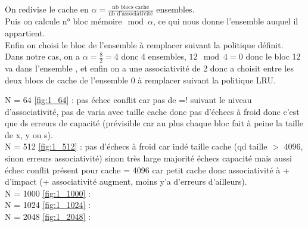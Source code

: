 \documentclass[12pt]{base}
\begin{document}


On redivise le cache en $\alpha = \frac{\text{nb blocs cache}}{\text{nb d'associativité}}$ ensembles.\\
\newline
Puis on calcule n° bloc mémoire$\mod \alpha$, ce qui nous donne l'ensemble auquel il appartient.\\
Enfin on choisi le bloc de l'ensemble à remplacer suivant la politique définit.\\
Dans notre cas, on a $\alpha = \frac{8}{2} = 4$ donc 4 ensembles, $12 \mod 4 = 0$ donc le bloc 12 va dans l'ensemble , et enfin on a une associativité de 2 donc a choisit entre les deux blocs de cache de l'ensemble 0 à remplacer suivant la politique LRU.

\newpage

N = 64 \ref{fig:1_64} : pas échec conflit car pas de =! suivant le niveau d'associativité, pas de varia avec taille cache donc pas d'échecs à froid donc c'est que ds erreurs de capacité (prévisible car au plus chaque bloc fait à peine la taille de x, y ou s).\\
N = 512 \ref{fig:1_512} : pas d'échecs à froid car indé taille cache (qd taille $>$ 4096, sinon erreurs associativité) sinon très large majorité échecs capacité mais aussi échec conflit présent pour cache = 4096 car petit cache donc associativité à + d'impact (+ associativité augment, moins y'a d'erreurs d'ailleurs).\\
N = 1000 \ref{fig:1_1000} :\\
N = 1024 \ref{fig:1_1024} :\\
N = 2048 \ref{fig:1_2048} :\\
\end{document}

